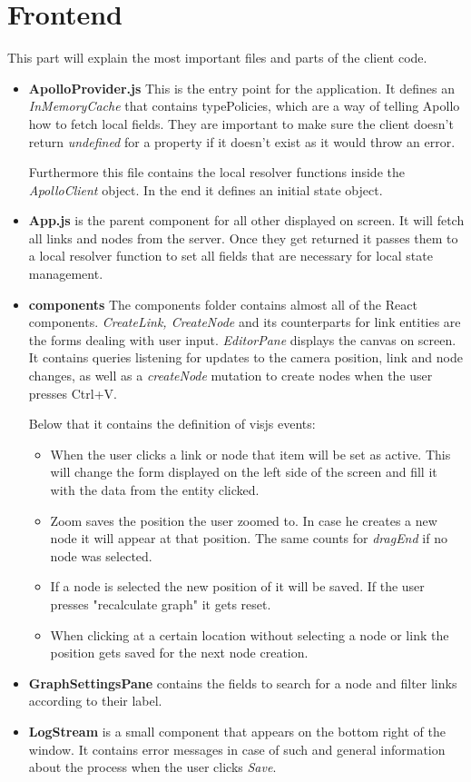 \section{Frontend}
This part will explain the most important files and parts of the client code.
\begin{itemize}
\item \textbf{ApolloProvider.js} This is the entry point for the application. It defines an \emph{InMemoryCache} that contains typePolicies, which are a way of telling Apollo how to fetch local fields. They are important to make sure the client doesn't return \emph{undefined} for a property if it doesn't exist as it would throw an error.

Furthermore this file contains the local resolver functions inside the \emph{ApolloClient} object. In the end it defines an initial state object.

\item \textbf{App.js} is the parent component for all other displayed on screen. It will fetch all links and nodes from the server. Once they get returned it passes them to a local resolver function to set all fields that are necessary for local state management.

\item \textbf{components} The components folder contains almost all of the React components. \emph{CreateLink, CreateNode} and its counterparts for link entities are the forms dealing with user input. \emph{EditorPane} displays the canvas on screen. It contains queries listening for updates to the camera position, link and node changes, as well as a \emph{createNode} mutation to create nodes when the user presses Ctrl+V.

Below that it contains the definition of visjs events:
\begin{itemize}
\item When the user clicks a link or node that item will be set as active. This will change the form displayed on the left side of the screen and fill it with the data from the entity clicked.
\item  Zoom saves the position the user zoomed to.  In case he creates a new node it will appear at that position. The same counts for \emph{dragEnd} if no node was selected.
\item If a node is selected the new position of it will be saved. If the user presses "recalculate graph" it gets reset.
\item When clicking at a certain location without selecting a node or link the position gets saved for the next node creation.
\end{itemize}

\item \textbf{GraphSettingsPane} contains the fields to search for a node and filter links according to their label.

\item \textbf{LogStream} is a small component that appears on the bottom right of the window. It contains error messages in case of such and general information about the process when the user clicks \emph{Save}.
\end{itemize}


